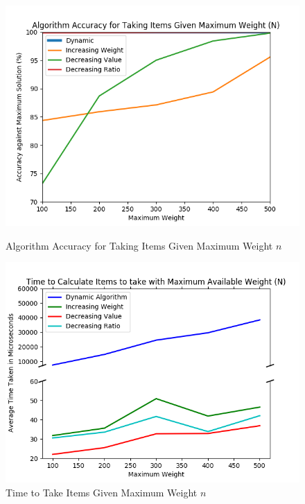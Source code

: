 \documentclass[10pt, letterpaper]{article}
\begin{document}
\begin{figure}[!htp]
	\centering
	\begin{minipage}[t]{0.49\textwidth}
		\includegraphics[width=\textwidth]{python/accuracyGraph.png}
		\caption{Algorithm Accuracy for Taking Items Given Maximum Weight $n$}
		\label{fig:accuracy-graph}
	\end{minipage}
	\hfill
	\begin{minipage}[t]{0.49\textwidth}
		\includegraphics[width=\textwidth]{python/timeGraph.png}
		\caption{Time to Take Items Given Maximum Weight $n$}
		\label{fig:time-graph}
	\end{minipage}
\end{figure}
\end{document}
